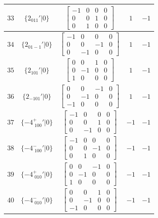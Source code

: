 \documentclass[fleqn,8pt]{jsarticle}
\begin{document}
\begin{longtable}{ccccc}
$ 33 $ & $ \{2{}_{011}{}'|0\} $ & $ \begin{bmatrix} -1 & 0 & 0 & 0 \\ 0 & 0 & 1 & 0 \\ 0 & 1 & 0 & 0 \end{bmatrix} $ & $ 1 $ & $ -1 $ \\ \hline
$ 34 $ & $ \{2{}_{01-1}{}'|0\} $ & $ \begin{bmatrix} -1 & 0 & 0 & 0 \\ 0 & 0 & -1 & 0 \\ 0 & -1 & 0 & 0 \end{bmatrix} $ & $ 1 $ & $ -1 $ \\ \hline
$ 35 $ & $ \{2{}_{101}{}'|0\} $ & $ \begin{bmatrix} 0 & 0 & 1 & 0 \\ 0 & -1 & 0 & 0 \\ 1 & 0 & 0 & 0 \end{bmatrix} $ & $ 1 $ & $ -1 $ \\ \hline
$ 36 $ & $ \{2{}_{-101}{}'|0\} $ & $ \begin{bmatrix} 0 & 0 & -1 & 0 \\ 0 & -1 & 0 & 0 \\ -1 & 0 & 0 & 0 \end{bmatrix} $ & $ 1 $ & $ -1 $ \\ \hline
$ 37 $ & $ \{-4^{+}_{\,\,100}{}'|0\} $ & $ \begin{bmatrix} -1 & 0 & 0 & 0 \\ 0 & 0 & 1 & 0 \\ 0 & -1 & 0 & 0 \end{bmatrix} $ & $ -1 $ & $ -1 $ \\ \hline
$ 38 $ & $ \{-4^{-}_{\,\,100}{}'|0\} $ & $ \begin{bmatrix} -1 & 0 & 0 & 0 \\ 0 & 0 & -1 & 0 \\ 0 & 1 & 0 & 0 \end{bmatrix} $ & $ -1 $ & $ -1 $ \\ \hline
$ 39 $ & $ \{-4^{+}_{\,\,010}{}'|0\} $ & $ \begin{bmatrix} 0 & 0 & -1 & 0 \\ 0 & -1 & 0 & 0 \\ 1 & 0 & 0 & 0 \end{bmatrix} $ & $ -1 $ & $ -1 $ \\ \hline
$ 40 $ & $ \{-4^{-}_{\,\,010}{}'|0\} $ & $ \begin{bmatrix} 0 & 0 & 1 & 0 \\ 0 & -1 & 0 & 0 \\ -1 & 0 & 0 & 0 \end{bmatrix} $ & $ -1 $ & $ -1 $ \\ \hline

\end{longtable}
\end{document}
